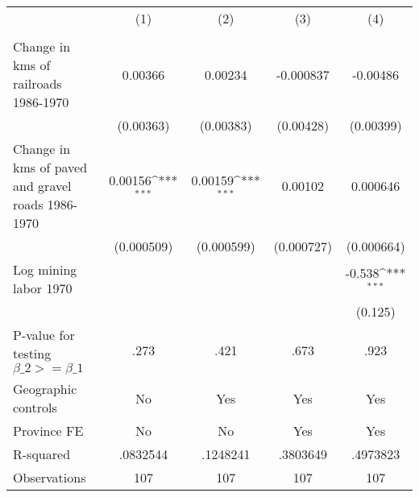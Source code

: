 {
\def\sym#1{\ifmmode^{#1}\else\(^{#1}\)\fi}
\begin{tabular}{l*{4}{c}}
\hline\hline
                &\multicolumn{1}{c}{(1)}&\multicolumn{1}{c}{(2)}&\multicolumn{1}{c}{(3)}&\multicolumn{1}{c}{(4)}\\
                &\multicolumn{1}{c}{}&\multicolumn{1}{c}{}&\multicolumn{1}{c}{}&\multicolumn{1}{c}{}\\
\hline
Change in kms of railroads 1986-1970&  0.00366         &  0.00234         &-0.000837         & -0.00486         \\
                &(0.00363)         &(0.00383)         &(0.00428)         &(0.00399)         \\
[1em]
Change in kms of paved and gravel roads 1986-1970&  0.00156\sym{***}&  0.00159\sym{***}&  0.00102         & 0.000646         \\
                &(0.000509)         &(0.000599)         &(0.000727)         &(0.000664)         \\
[1em]
Log mining labor 1970&                  &                  &                  &   -0.538\sym{***}\\
                &                  &                  &                  &  (0.125)         \\
\hline
P-value for testing $\beta\_{2} >= \beta\_{1}$&     .273         &     .421         &     .673         &     .923         \\
Geographic controls&       No         &      Yes         &      Yes         &      Yes         \\
Province FE     &       No         &       No         &      Yes         &      Yes         \\
R-squared       & .0832544         & .1248241         & .3803649         & .4973823         \\
Observations    &      107         &      107         &      107         &      107         \\
\hline\hline
\end{tabular}
}
